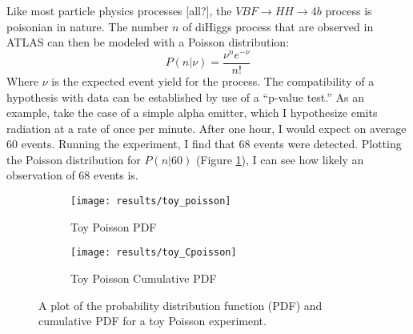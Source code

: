     Like most particle physics processes [all?], the $VBF \to HH \to 4b$ process is poisonian in nature.
    The number $n$ of diHiggs process that are observed in ATLAS can then be modeled with a Poisson distribution\cite{cranmer2015practical}:
    \begin{equation}
        P(n|\nu) = \frac{ \nu^n e^{-\nu} }{n!}
    \end{equation}
    Where $\nu$ is the expected event yield for the process.
    The compatibility of a hypothesis with data can be established by use of a ``p-value test.''
    As an example, take the case of a simple alpha emitter,
        which I hypothesize emits radiation at a rate of once per minute.
    After one hour, I would expect on average 60 events.
    Running the experiment, I find that 68 events were detected.
    Plotting the Poisson distribution for $P(n|60)$ (Figure \ref{fig:poisson_toy_sig:pdf}),
        I can see how likely an observation of 68 events is.
    \begin{figure}
        \centering
        \begin{subfigure}{0.48\textwidth} 
            \texttt{[image: results/toy\_poisson]}
            \caption{Toy Poisson PDF}
            \label{fig:poisson_toy_sig:pdf}
        \end{subfigure}
        \begin{subfigure}{0.48\textwidth}
            \texttt{[image: results/toy\_Cpoisson]}
            \caption{Toy Poisson Cumulative PDF}
            \label{fig:poisson_toy_sig:Cpdf}
        \end{subfigure}
        \caption{
            A plot of the probability distribution function (PDF)
                and cumulative PDF for a toy Poisson experiment.
        }
    \end{figure}

